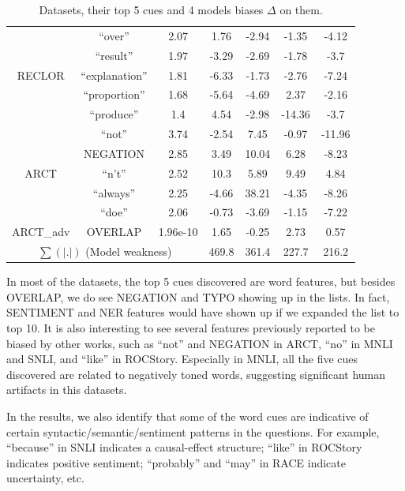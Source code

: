 \begin{table}[th]
\begin{tabular}{c|c|c|c|c|c|c}
	   \hline 
\multirow{5}{*}{RECLOR} 
& ``over'' & 2.07 & 1.76 &-2.94 & -1.35& -4.12 \\                                                                      
& ``result'' & 1.97 & -3.29 &-2.69 & -1.78& -3.7 \\
& ``explanation'' & 1.81 & -6.33 &-1.73 & -2.76& -7.24 \\
& ``proportion'' & 1.68 & -5.64 &-4.69 & 2.37& -2.16 \\
& ``produce'' & 1.4 & 4.54 &-2.98 & -14.36& -3.7 \\
	   \hline 
\multirow{5}{*}{ARCT} 
& ``not'' & 3.74 & -2.54 &7.45 & -0.97& -11.96 \\                                                                      
& NEGATION & 2.85 & 3.49 &10.04 & 6.28& -8.23 \\
& ``n't'' & 2.52 & 10.3 &5.89 & 9.49& 4.84 \\
& ``always'' & 2.25 & -4.66 &38.21 & -4.35& -8.26 \\
& ``doe'' & 2.06 & -0.73 &-3.69 & -1.15& -7.22 \\
	   \hline 
ARCT\_adv& OVERLAP & 1.96e-10 & 1.65 &-0.25 & 2.73& 0.57 \\\hline
\multicolumn{3}{c|}{$\sum(|.|)$ (Model weakness)} 	& 469.8 & 361.4 & 227.7 & 216.2 \\
\hline 
\end{tabular}
\caption{Datasets, their top 5 cues and 4 models biases $\Delta$ on them.}\label{tab:bias}
\end{table}

In most of the datasets, the top 5 cues discovered are word features,
but besides OVERLAP, we do see NEGATION and TYPO showing up
in the lists. In fact, SENTIMENT and NER features would have shown up
if we expanded the list to top 10. It is also interesting to see several features previously
reported to be biased by other works, such as ``not'' and NEGATION in
ARCT, ``no'' in MNLI and SNLI, and ``like'' in ROCStory.  Especially in
MNLI, all the five cues discovered are related to negatively toned words,
suggesting significant human artifacts in this datasets.
 
In the results, we also identify that some of the word cues are indicative of
certain syntactic/semantic/sentiment patterns in the questions. For example, ``because'' in SNLI
indicates a causal-effect structure; ``like'' in ROCStory indicates positive sentiment;
``probably'' and ``may'' in RACE indicate uncertainty, etc. 


